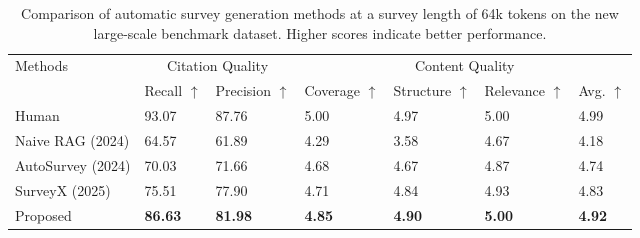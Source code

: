\documentclass[manuscript,review,anonymous]{acmart}
\begin{document}
\begin{table*}[]
    \centering
    \begin{adjustbox}{width=0.75\linewidth}
        \begin{tabular}{lllllll}
            \toprule
            \multirow{2.5}{*}{Methods} & \multicolumn{2}{c}{Citation Quality} & \multicolumn{4}{c}{Content Quality} \\
            \cmidrule(lr){2-3} \cmidrule(lr){4-7}
            & Recall $\uparrow$ & Precision $\uparrow$ & Coverage $\uparrow$ & Structure $\uparrow$ & Relevance $\uparrow$ & Avg. $\uparrow$ \\
            \midrule
            Human                & 93.07 & 87.76 & 5.00 & 4.97 & 5.00 & 4.99 \\
            Naive RAG (2024)     & 64.57 & 61.89 & 4.29 & 3.58 & 4.67 & 4.18 \\
            AutoSurvey (2024)    & 70.03 & 71.66 & 4.68 & 4.67 & 4.87 & 4.74 \\
            SurveyX (2025)       & 75.51 & 77.90 & 4.71 & 4.84 & 4.93 & 4.83 \\
            \cellcolor{gray!15}Proposed & \cellcolor{gray!15}\textbf{86.63} & \cellcolor{gray!15}\textbf{81.98} & \cellcolor{gray!15}\textbf{4.85} & \cellcolor{gray!15}\textbf{4.90} & \cellcolor{gray!15}\textbf{5.00} & \cellcolor{gray!15}\textbf{4.92} \\
            \bottomrule
        \end{tabular}
    \end{adjustbox}
    \caption{Comparison of automatic survey generation methods at a survey length of 64k tokens on the new large-scale benchmark dataset. Higher scores indicate better performance.}
    \label{tab:comparison_64k}
\end{table*}
\end{document}
